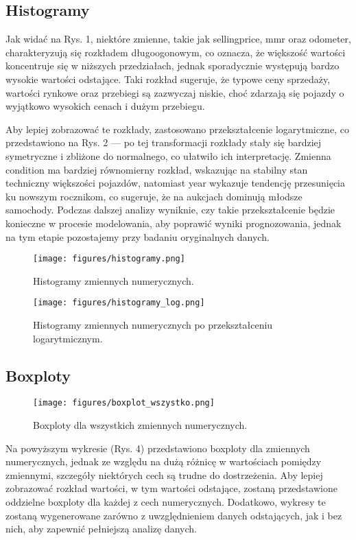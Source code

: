 \documentclass[10pt,letterpaper]{article}
\begin{document}
\subsection{Histogramy}

Jak widać na Rys. 1, niektóre zmienne, takie jak sellingprice, mmr oraz odometer, charakteryzują się rozkładem długoogonowym, co oznacza, że większość wartości koncentruje się w niższych przedziałach, jednak sporadycznie występują bardzo wysokie wartości odstające. Taki rozkład sugeruje, że typowe ceny sprzedaży, wartości rynkowe oraz przebiegi są zazwyczaj niskie, choć zdarzają się pojazdy o wyjątkowo wysokich cenach i dużym przebiegu. 

Aby lepiej zobrazować te rozkłady, zastosowano przekształcenie logarytmiczne, co przedstawiono na Rys. 2 — po tej transformacji rozkłady stały się bardziej symetryczne i zbliżone do normalnego, co ułatwiło ich interpretację. Zmienna condition ma bardziej równomierny rozkład, wskazując na stabilny stan techniczny większości pojazdów, natomiast year wykazuje tendencję przesunięcia ku nowszym rocznikom, co sugeruje, że na aukcjach dominują młodsze samochody. Podczas dalszej analizy wyniknie, czy takie przekształcenie będzie konieczne w procesie modelowania, aby poprawić wyniki prognozowania, jednak na tym etapie pozostajemy przy badaniu oryginalnych danych.

\begin{figure}[H]
\begin{center}
   \texttt{[image: figures/histogramy.png]}
\caption{Histogramy zmiennych numerycznych.}
   \label{fig:other-figure}
\end{center}
\end{figure}

\begin{figure}[H]
\begin{center}
   \texttt{[image: figures/histogramy\_log.png]}
   \caption{Histogramy zmiennych numerycznych po przekształceniu logarytmicznym.}
   \label{fig:other-figure-log}
\end{center}
\end{figure}

\subsection{Boxploty}
\begin{figure}[H]
\begin{center}
   \texttt{[image: figures/boxplot\_wszystko.png]}
   \caption{Boxploty dla wszystkich zmiennych numerycznych.}
   \label{fig:other-figure-log}
\end{center}
\end{figure}
Na powyższym wykresie (Rys. 4) przedstawiono boxploty dla zmiennych numerycznych, jednak ze względu na dużą różnicę w wartościach pomiędzy zmiennymi, szczegóły niektórych cech są trudne do dostrzeżenia. Aby lepiej zobrazować rozkład wartości, w tym wartości odstające, zostaną przedstawione oddzielne boxploty dla każdej z cech numerycznych. Dodatkowo, wykresy te zostaną wygenerowane zarówno z uwzględnieniem danych odstających, jak i bez nich, aby zapewnić pełniejszą analizę danych.
\end{document}
